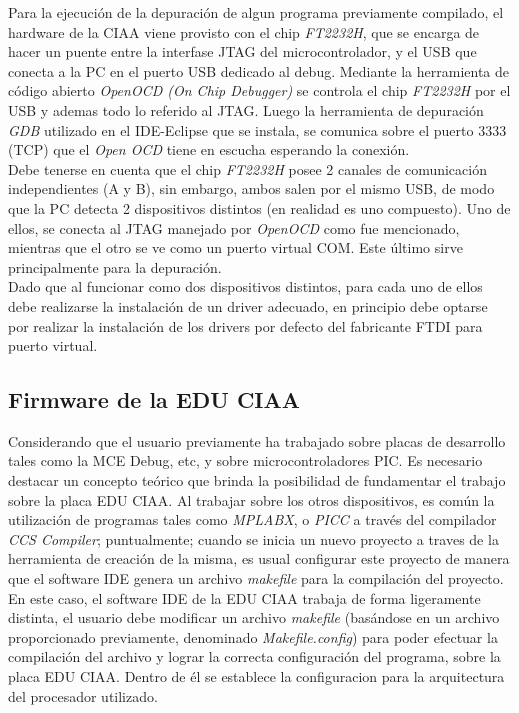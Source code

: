 \documentclass[12pt,letterpaper]{article}
\begin{document}
Para la ejecución de la depuración de algun programa previamente compilado, el hardware de la CIAA viene provisto con el chip \textit{FT2232H}, que se encarga de hacer un puente entre la interfase JTAG del microcontrolador, y el USB que conecta a la PC en el puerto USB dedicado al debug. Mediante la herramienta de código abierto \textit{OpenOCD (On Chip Debugger)} se controla el chip \textit{FT2232H} por el USB y ademas todo lo referido al JTAG. Luego la herramienta de depuración \textit{GDB} utilizado en el IDE-Eclipse que se instala, se comunica sobre el puerto 3333 (TCP) que el \textit{Open OCD} tiene en escucha esperando la conexión\cite{descripcionopenocd}.
 \\
 
Debe tenerse en cuenta que el chip \textit{FT2232H} posee 2 canales de comunicación independientes (A y B), sin embargo, ambos salen por el mismo USB, de modo que la PC detecta 2 dispositivos distintos (en realidad es uno compuesto). Uno de ellos, se conecta al JTAG manejado por \textit{OpenOCD} como fue mencionado, mientras que el otro se ve como un puerto virtual COM. Este último sirve principalmente para la depuración.
 \\

Dado que al funcionar como dos dispositivos distintos, para cada uno de ellos debe realizarse la instalación de un driver adecuado, en principio debe optarse por realizar la instalación de los drivers por defecto del fabricante FTDI para puerto virtual. %

\subsection{Firmware de la EDU CIAA}
Considerando que el usuario previamente ha trabajado sobre placas de desarrollo tales como la MCE Debug, etc, y sobre microcontroladores PIC. Es necesario destacar un concepto teórico que brinda la posibilidad de fundamentar el trabajo sobre la placa EDU CIAA. Al trabajar sobre los otros dispositivos, es común la utilización de programas tales como \textit{MPLABX}, o \textit{PICC} a través del compilador \textit{CCS Compiler}; puntualmente; cuando se inicia un nuevo proyecto a traves de la herramienta de creación de la misma, es usual configurar este proyecto de manera que el software IDE genera un archivo \textit{makefile} para la compilación del proyecto.
 \\
 
En este caso, el software IDE de la EDU CIAA trabaja de forma ligeramente distinta, el usuario debe modificar un archivo \textit{makefile} (basándose en un archivo proporcionado previamente, denominado \textit{Makefile.config}) para poder efectuar la compilación del archivo y lograr la correcta configuración del programa, sobre la placa EDU CIAA. Dentro de él se establece la configuracion para la arquitectura del procesador utilizado.
 \\
 
\end{document}

